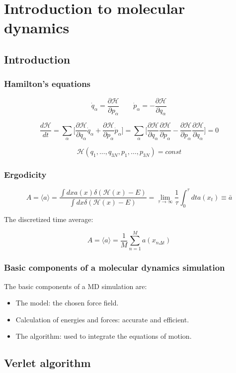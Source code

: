 \chapter{Introduction to molecular dynamics}

\section{Introduction}

	\subsection{Hamilton's equations}

	$$\dot{q}_\alpha = \frac{\partial\mathcal{H}}{\partial p_\alpha}\qquad\dot{p}_\alpha = - \frac{\partial\mathcal{H}}{\partial q_\alpha}$$

	$$\frac{d\mathcal{H}}{dt} = \sum\limits_\alpha\biggl[\frac{\partial\mathcal{H}}{\partial q_\alpha}\dot{q}_\alpha + \frac{\partial\mathcal{H}}{\partial p_\alpha}\dot{p}_\alpha\biggr] = \sum\limits_\alpha\biggl[\frac{\partial\mathcal{H}}{\partial q_\alpha}\frac{\partial\mathcal{H}}{\partial p_\alpha}-\frac{\partial\mathcal{H}}{\partial p_\alpha}\frac{\partial\mathcal{H}}{\partial q_\alpha}\biggr] = 0$$

	$$\mathcal{H}(q_1, \dots, q_{3N}, p_1, \dots, p_{3N}) = const$$

	\subsection{Ergodicity}

	$$A = \langle a\rangle = \frac{\int dxa(x)\delta(\mathcal{H}(x)-E)}{\int dx\delta(\mathcal{H}(x)-E)} = \lim\limits_{\tau\rightarrow\infty}\frac{1}{\tau}\int_0^\tau dta(x_t)\equiv\bar{a}$$

	The discretized time average:

	$$A = \langle a\rangle = \frac{1}{M}\sum\limits_{n=1}^M a(x_{n\Delta t})$$

	\subsection{Basic components of a molecular dynamics simulation}
	The basic components of a MD simulation are:

	\begin{multicols}{2}
		\begin{itemize}
			\item The model: the chosen force field.
			\item Calculation of energies and forces: accurate and efficient.
			\item The algorithm: used to integrate the equations of motion.
		\end{itemize}
	\end{multicols}

\section{Verlet algorithm}
